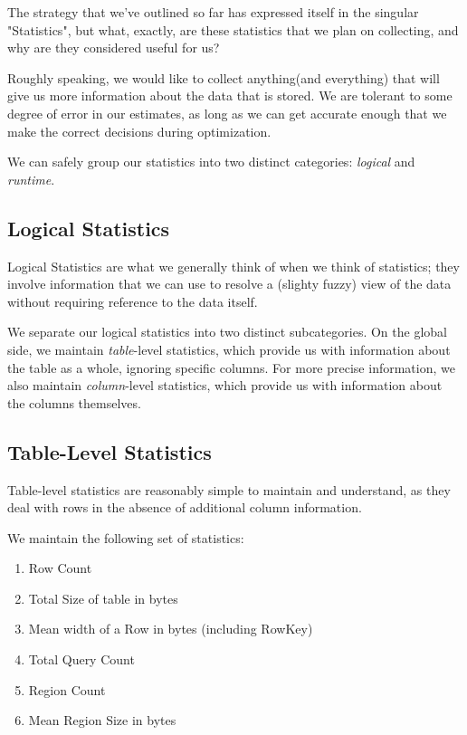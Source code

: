 The strategy that we've outlined so far has expressed itself in the singular "Statistics", but what, exactly, are these statistics that we plan on collecting, and why are they considered useful for us?

Roughly speaking, we would like to collect anything(and everything) that will give us more information about the data that is stored. We are tolerant to some degree of error in our estimates, as long as we can get accurate enough that we make the correct decisions during optimization. 

We can safely group our statistics into two distinct categories: \emph{logical} and \emph{runtime}.  

\subsection{Logical Statistics}
Logical Statistics are what we generally think of when we think of statistics; they involve information that we can use to resolve a (slighty fuzzy) view of the data without requiring reference to the data itself.

We separate our logical statistics into two distinct subcategories. On the global side, we maintain \emph{table}-level statistics, which provide us with information about the table as a whole, ignoring specific columns. For more precise information, we also maintain \emph{column}-level statistics, which provide us with information about the columns themselves.

\subsection{Table-Level Statistics}
Table-level statistics are reasonably simple to maintain and understand, as they deal with rows in the absence of additional column information. 

We maintain the following set of statistics:

\begin{enumerate}
				\item Row Count
				\item Total Size of table in bytes
				\item Mean width of a Row in bytes (including RowKey)
				\item Total Query Count
				\item Region Count
				\item Mean Region Size in bytes
\end{enumerate}

